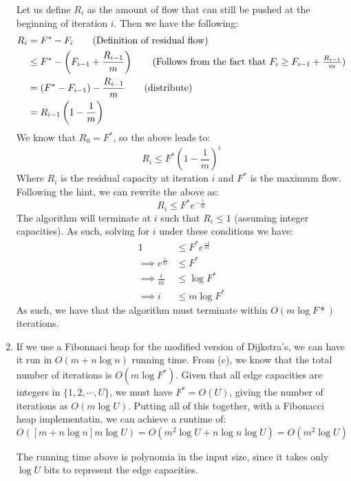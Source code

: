 \documentclass[12pt]{exam}
\begin{document}
\begin{questions}
\begin{solution}
\begin{enumerate}[label=(\alph*)]
      Let us define $R_i$ as the amount of flow that can still be pushed at the beginning of iteration $i$. Then we have the following:
      \begin{align*}
        R_i &= F^* - F_i \tag{Definition of residual flow} \\
        &\leq F^* - \left(F_{i-1} + \frac{R_{i-1}}{m}\right) \tag{Follows from the fact that $F_i \geq F_{i-1} + \frac{R_{i-1}}{m}$} \\
        &= (F^* - F_{i-1}) - \frac{R_{i-1}}{m} \tag{distribute} \\
        &= R_{i-1}\left( 1 - \frac{1}{m}\right)
      \end{align*}
      We know that $R_0 = F^*$, so the above leads to:
      \[
        R_i \leq F^*\left(1- \frac{1}{m}\right)^i
      \]
      Where $R_i$ is the residual capacity at iteration $i$ and $F^*$ is the maximum flow. Following the hint, we can rewrite the above as:
      \[
        R_i \leq F^{*}e^{-\frac{i}{m}}
      \]
      The algorithm will terminate at $i$ such that $R_i \leq 1$ (assuming integer capacities). As such, solving for $i$ under these conditions we have:
      \begin{align*}
        1 &\leq F^{*} e^{\frac{-i}{m}} \tag{Termination condition} \\
        \implies e^{\frac{i}{m}} &\leq F^* \\
        \implies \frac{i}{m} &\leq \log F^* \\ 
        \implies i &\leq m \log F^*
      \end{align*}
      As such, we have that the algorithm must terminate within $O(m \log F*)$ iterations.
    \item 
      If we use a Fibonnaci heap for the modified version of Dijkstra's, we can have it run in $O(m + n \log n)$ running time. From (c), we know that the total number of iterations is $O(m \log F^*)$. Given that all edge capacities are integers in $\{1,2,\cdots,U\}$, we must have $F^* = O(U)$, giving the number of iterations as $O(m \log U)$. Putting all of this together, with a Fibonacci heap implementatin, we can achieve a runtime of:
      \[
        O([m + n \log n]m \log U) = O(m^2 \log U + n\log n \log U) = O(m^2 \log U)
      \]

      The running time above is polynomia in the input size, since it takes only $\log U$ bits to represent the edge capacities.
  \end{enumerate}
\end{solution}


\end{questions}
\end{document}
